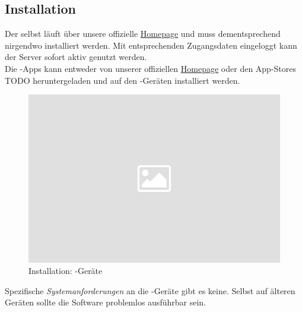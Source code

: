 \subsection{Installation}

\noindent
Der \ser selbst läuft über unsere offizielle \href{http://www.bridge-clubs.de}{Homepage}
und muss dementsprechend nirgendwo installiert werden. Mit entsprechenden
Zugangsdaten eingeloggt kann der Server sofort aktiv genutzt werden.\\[.1cm]

\noindent
Die \cli-Apps kann entweder von unserer offiziellen \href{http://www.bridge-clubs.de}{Homepage}
oder den App-Stores TODO heruntergeladen und auf den \cli-Geräten installiert werden.\\[.1cm]

\noindent
\begin{figure}[ht]
	\centering
  \includegraphics[width=16cm]{pictures/placeholder.png}
	\caption{Installation: \cli-Geräte}
	\label{pic/install}
\end{figure}


\noindent
Spezifische \textit{Systemanforderungen} an die \cli-Geräte gibt es keine. Selbst auf
älteren Geräten sollte die \bb Software problemlos ausführbar sein.
